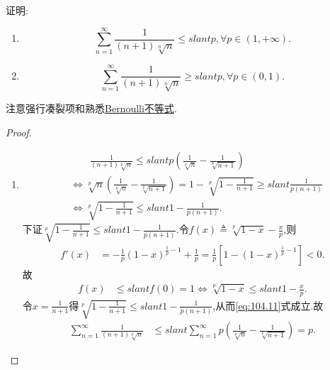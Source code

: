 \documentclass[../../main.tex]{subfiles}
\begin{document}
\begin{example}
证明:
\begin{enumerate}
\item $$\sum_{n=1}^\infty \frac{1}{(n+1)\sqrt[n]{n}} \leqslant slant p,\forall p \in (1,+\infty).$$

\item $$\sum_{n=1}^\infty \frac{1}{(n+1)\sqrt[n]{n}} \geqslant slant p,\forall p \in (0,1).$$
\end{enumerate}
\end{example}
\begin{note}
注意强行凑裂项和熟悉\hyperref[theorem:Bernoulli不等式]{Bernoulli不等式}.
\end{note}
\begin{proof}
\begin{enumerate}
\item \begin{align}
&\quad \quad \frac{1}{\left( n+1 \right) \sqrt[p]{n}}\leqslant slant p\left( \frac{1}{\sqrt[p]{n}}-\frac{1}{\sqrt[p]{n+1}} \right) \label{eq:104.11} \\
&\Longleftrightarrow \sqrt[p]{n}\left( \frac{1}{\sqrt[p]{n}}-\frac{1}{\sqrt[p]{n+1}} \right) =1-\sqrt[p]{1-\frac{1}{n+1}}\geqslant slant \frac{1}{p\left( n+1 \right)} \nonumber \\
&\Longleftrightarrow \sqrt[p]{1-\frac{1}{n+1}}\leqslant slant 1-\frac{1}{p\left( n+1 \right)}.\nonumber
\end{align}
下证$\sqrt[p]{1-\frac{1}{n+1}}\leqslant slant 1-\frac{1}{p\left( n+1 \right)}$.令$f\left( x \right) \triangleq \sqrt[p]{1-x}-\frac{x}{p}$,则
\begin{align*}
f\prime \left( x \right) &=-\frac{1}{p}\left( 1-x \right) ^{\frac{1}{p}-1}+\frac{1}{p}=\frac{1}{p}\left[ 1-\left( 1-x \right) ^{\frac{1}{p}-1} \right] <0.
\end{align*}
故
\begin{align*}
f\left( x \right) &\leqslant slant f\left( 0 \right) =1\Longleftrightarrow \sqrt[p]{1-x}\leqslant slant 1-\frac{x}{p}.
\end{align*}
令$x=\frac{1}{n+1}$得$\sqrt[p]{1-\frac{1}{n+1}}\leqslant slant 1-\frac{1}{p\left( n+1 \right)}$,从而\eqref{eq:104.11}式成立.故
\begin{align*}
\sum_{n=1}^{\infty}{\frac{1}{\left( n+1 \right) \sqrt[p]{n}}}&\leqslant slant \sum_{n=1}^{\infty}{p\left( \frac{1}{\sqrt[p]{n}}-\frac{1}{\sqrt[p]{n+1}} \right)}=p.
\end{align*}


\end{enumerate}
\end{proof}
\end{document}
